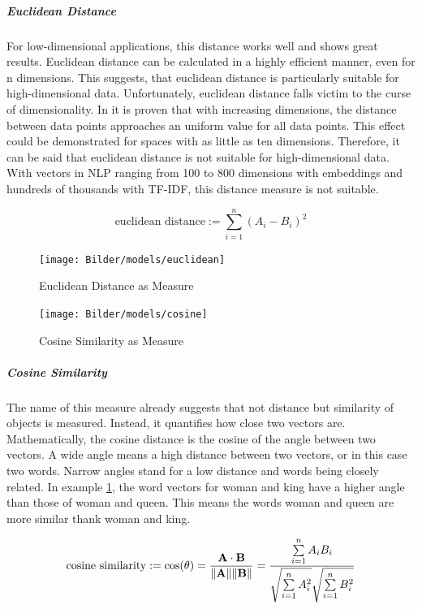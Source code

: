	
		\subparagraph{Euclidean Distance} \label{euclidean}
		For low-dimensional applications, this distance works well and shows great results. Euclidean distance can be calculated in a highly efficient manner, even for n dimensions. This suggests, that euclidean distance is particularly suitable for high-dimensional data. Unfortunately, euclidean distance falls victim to the curse of dimensionality. In \cite[p.~1]{beyerNearestNeighbor} it is proven that with increasing dimensions, the distance between data points approaches an uniform value for all data points. This effect could be demonstrated for spaces with as little as ten dimensions. Therefore, it can be said that euclidean distance is not suitable for high-dimensional data. With vectors in \ac{NLP} ranging from 100 to 800 dimensions with embeddings and hundreds of thousands with \ac{TF-IDF}, this distance measure is not suitable.
		
				\[ 
		\text{euclidean distance} :=  \sum\limits_{i=1}^{n}{(A_i -  B_i)^{2}} 
		\]
		
		\begin{figure} 
			\begin{minipage}{0.49\textwidth}
				\label{fig:euclidean}
				
				\texttt{[image: Bilder/models/euclidean]}
				\caption{Euclidean Distance as Measure}
			\end{minipage}
			\hfill
			\begin{minipage}{0.49\textwidth}
				\texttt{[image: Bilder/models/cosine]}
				\caption{Cosine Similarity as Measure}
				\label{fig:cosine}
			\end{minipage}
			\hfill
		\end{figure} 
	
		\subparagraph{Cosine Similarity}
		The name of this measure already suggests that not distance but similarity of objects is measured. Instead, it quantifies how close two vectors are.  Mathematically, the cosine distance is the cosine of the angle between two vectors. A wide angle means a high distance between two vectors, or in this case two words. Narrow angles stand for a low distance and words being closely related. In example \ref{fig:cosine}, the word vectors for woman and king have a higher angle than those of woman and queen. This means the words woman and queen are more similar thank woman and king.
		
		\[ 
		\text{cosine similarity} := \cos(\theta) = {\mathbf{A} \cdot \mathbf{B} \over \|\mathbf{A}\| \|\mathbf{B}\|} = \frac{ \sum\limits_{i=1}^{n}{A_i  B_i} }{ \sqrt{\sum\limits_{i=1}^{n}{A_i^2}}  \sqrt{\sum\limits_{i=1}^{n}{B_i^2}} }
		  \]
		
